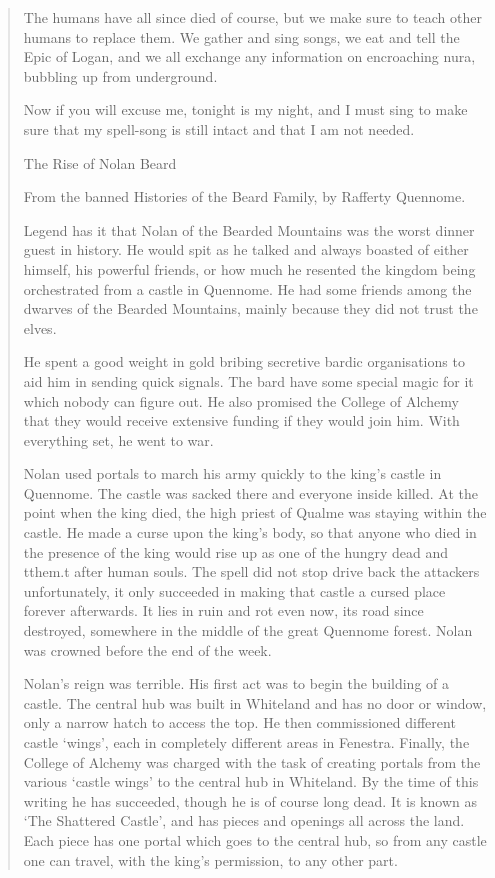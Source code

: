 \begin{quotation}
	The humans have all since died of course, but we make sure to teach other humans to replace them.  We gather and sing songs, we eat and tell the Epic of Logan, and we all exchange any information on encroaching nura, bubbling up from underground.

	Now if you will excuse me, tonight is my night, and I must sing to make sure that my spell-song is still intact and that I am not needed.

The Rise of Nolan Beard

From the banned Histories of the Beard Family, by Rafferty Quennome.

Legend has it that Nolan of the Bearded Mountains was the worst dinner guest in history.  He would spit as he talked and always boasted of either himself, his powerful friends, or how much he resented the kingdom being orchestrated from a castle in Quennome.  He had some friends among the dwarves of the Bearded Mountains, mainly because they did not trust the elves.

	He spent a good weight in gold bribing secretive bardic organisations to aid him in sending quick signals.  The bard have some special magic for it which nobody can figure out.  He also promised the College of Alchemy that they would receive extensive funding if they would join him.  With everything set, he went to war.

	Nolan used portals to march his army quickly to the king's castle in Quennome.  The castle was sacked there and everyone inside killed.  At the point when the king died, the high priest of Qualme was staying within the castle.  He made a curse upon the king's body, so that anyone who died in the presence of the king would rise up as one of the hungry dead and tthem.t after human souls.  The spell did not stop drive back the attackers unfortunately, it only succeeded in making that castle a cursed place forever afterwards.  It lies in ruin and rot even now, its road since destroyed, somewhere in the middle of the great Quennome forest.  Nolan was crowned before the end of the week.

	Nolan's reign was terrible.  His first act was to begin the building of a castle.  The central hub was built in Whiteland and has no door or window, only a narrow hatch to access the top.  He then commissioned different castle `wings', each in completely different areas in Fenestra.  Finally, the College of Alchemy was charged with the task of creating portals from the various `castle wings' to the central hub in Whiteland.  By the time of this writing he has succeeded, though he is of course long dead.  It is known as `The Shattered Castle', and has pieces and openings all across the land.  Each piece has one portal which goes to the central hub, so from any castle one can travel, with the king's permission, to any other part.


\end{quotation}

